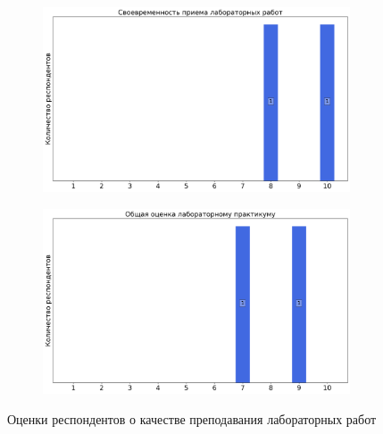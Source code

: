 \begin{figure}[H]
\begin{subfigure}[b]{0.45\textwidth}
				\includegraphics[width=\textwidth]{images/2 course/Радиотехнические цепи и сигналы/labniks-marks-Дудкин П.В.-2.png}
			\end{subfigure}
			\begin{subfigure}[b]{0.45\textwidth}
				\centering
				\includegraphics[width=\textwidth]{images/2 course/Радиотехнические цепи и сигналы/labniks-marks-Дудкин П.В.-3.png}
			\end{subfigure}	
			\caption{Оценки респондентов о качестве преподавания лабораторных работ}
		\end{figure}


        
